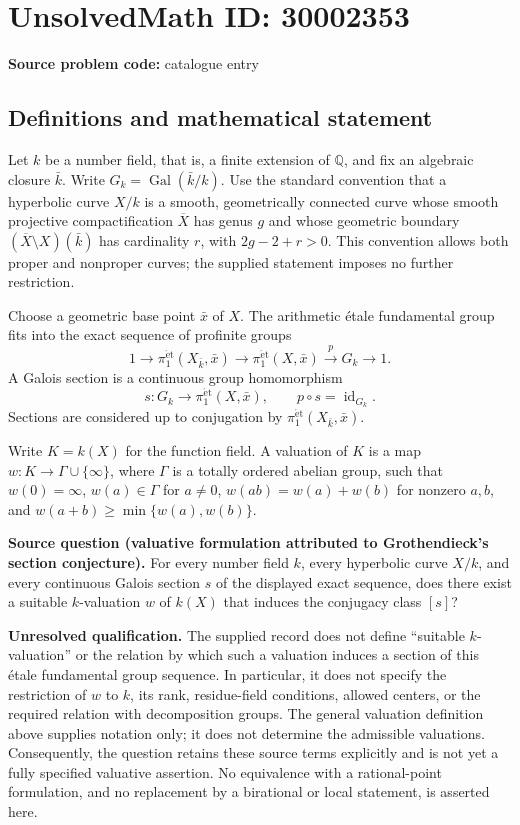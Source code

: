 \documentclass[11pt]{article}
\newcommand{\Q}{\mathbb{Q}}
\begin{document}
\section*{UnsolvedMath ID: 30002353}
\textbf{Source problem code:} catalogue entry
\subsection{Definitions and mathematical statement}
Let \(k\) be a number field, that is, a finite extension of \(\Q\), and fix an algebraic closure \(\bar k\). Write \(G_k=\operatorname{Gal}(\bar k/k)\). Use the standard convention that a hyperbolic curve \(X/k\) is a smooth, geometrically connected curve whose smooth projective compactification \(\overline X\) has genus \(g\) and whose geometric boundary \((\overline X\setminus X)(\bar k)\) has cardinality \(r\), with \(2g-2+r>0\). This convention allows both proper and nonproper curves; the supplied statement imposes no further restriction.

Choose a geometric base point \(\bar x\) of \(X\). The arithmetic étale fundamental group fits into the exact sequence of profinite groups
\[
1\longrightarrow \pi_1^{\mathrm{\acute et}}(X_{\bar k},\bar x)
\longrightarrow \pi_1^{\mathrm{\acute et}}(X,\bar x)
\xrightarrow{p}G_k\longrightarrow 1.
\]
A Galois section is a continuous group homomorphism
\[
s:G_k\longrightarrow\pi_1^{\mathrm{\acute et}}(X,\bar x),
\qquad p\circ s=\operatorname{id}_{G_k}.
\]
Sections are considered up to conjugation by \(\pi_1^{\mathrm{\acute et}}(X_{\bar k},\bar x)\).

Write \(K=k(X)\) for the function field. A valuation of \(K\) is a map \(w:K\to\Gamma\cup\{\infty\}\), where \(\Gamma\) is a totally ordered abelian group, such that \(w(0)=\infty\), \(w(a)\in\Gamma\) for \(a\ne0\), \(w(ab)=w(a)+w(b)\) for nonzero \(a,b\), and \(w(a+b)\ge\min\{w(a),w(b)\}\).

\textbf{Source question (valuative formulation attributed to Grothendieck's section conjecture).} For every number field \(k\), every hyperbolic curve \(X/k\), and every continuous Galois section \(s\) of the displayed exact sequence, does there exist a suitable \(k\)-valuation \(w\) of \(k(X)\) that induces the conjugacy class \([s]\)?

\textbf{Unresolved qualification.} The supplied record does not define ``suitable \(k\)-valuation'' or the relation by which such a valuation induces a section of this étale fundamental group sequence. In particular, it does not specify the restriction of \(w\) to \(k\), its rank, residue-field conditions, allowed centers, or the required relation with decomposition groups. The general valuation definition above supplies notation only; it does not determine the admissible valuations. Consequently, the question retains these source terms explicitly and is not yet a fully specified valuative assertion. No equivalence with a rational-point formulation, and no replacement by a birational or local statement, is asserted here.
\end{document}
